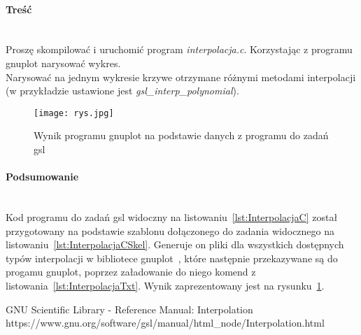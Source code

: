 \paragraph{Treść}~\\
Proszę skompilować i uruchomić program \textit{interpolacja.c}.
Korzystając z programu gnuplot narysować wykres.\\
Narysować na jednym wykresie krzywe otrzymane różnymi metodami interpolacji (w przykładzie ustawione jest \textit{gsl\_interp\_polynomial}).







\begin{figure}[h]
  \caption{Wynik programu gnuplot na podstawie danych z programu do zadań gsl}
  \label{fig:RysJpg}
  \centering
  \texttt{[image: rys.jpg]}
\end{figure}

\paragraph{Podsumowanie}~\\
Kod programu do zadań gsl widoczny na listowaniu~\ref{lst:InterpolacjaC} został przygotowany na podstawie szablonu dołączonego do zadania widocznego na listowaniu~\ref{lst:InterpolacjaCSkel}.
Generuje on pliki dla wszystkich dostępnych typów interpolacji w bibliotece gnuplot~\cite{GslManualInterpolation}, które następnie przekazywane są do progamu gnuplot, poprzez załadowanie do niego komend z listowania~\ref{lst:InterpolacjaTxt}.
Wynik zaprezentowany jest na rysunku~\ref{fig:RysJpg}.

\begin{thebibliography}{9}
   GNU Scientific Library - Reference Manual: Interpolation https://www.gnu.org/software/gsl/manual/html\_node/Interpolation.html
\end{thebibliography}
